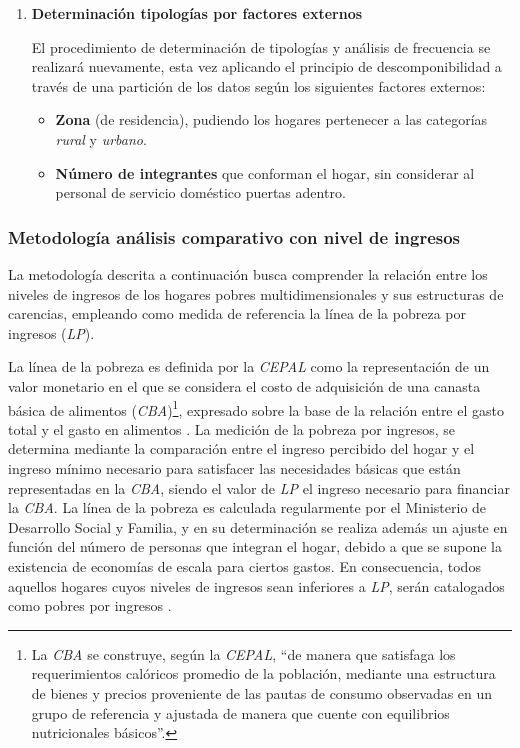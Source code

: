 \documentclass[12pt,letterpaper,spanish]{article}
\begin{document}
\begin{enumerate}
\item \textbf{Determinación tipologías por factores externos}

El procedimiento de determinación de tipologías y análisis de frecuencia se realizará nuevamente, esta vez  aplicando el principio de descomponibilidad a través de una partición de los datos según los siguientes factores externos:

    \begin{itemize}
        \item  \textbf{Zona} (de residencia), pudiendo los hogares pertenecer a las categorías \textit{rural} y \textit{urbano}. 
        \item \textbf{Número de integrantes} que conforman el hogar, sin considerar al personal de servicio doméstico puertas adentro. 
    \end{itemize}
\end{enumerate}


\subsubsection{Metodología análisis comparativo con nivel de ingresos}

La metodología descrita a continuación busca comprender la relación entre los niveles de ingresos de los hogares pobres multidimensionales y sus estructuras de carencias, empleando como medida de referencia la línea de la pobreza por ingresos (\textit{LP}). 

La línea de la pobreza es definida por la \textit{CEPAL} como la representación de un valor monetario en el que se considera el costo de adquisición de una canasta básica de alimentos (\textit{CBA})\footnote{La \textit{CBA} se construye, según la \textit{CEPAL},  ``de manera que satisfaga los requerimientos calóricos promedio de la población, mediante una estructura de bienes y precios proveniente de las pautas de consumo observadas en un grupo de referencia y ajustada de manera que cuente con equilibrios nutricionales básicos''\cite{CEPAL2018MedicionResultados}.}, expresado sobre la base de la relación entre el gasto total y el gasto en alimentos \cite{CEPAL2018MedicionResultados}. La medición de la pobreza por ingresos, se determina mediante la comparación entre el ingreso percibido del hogar y el ingreso mínimo necesario para satisfacer las necesidades básicas que están representadas en la \textit{CBA}, siendo el valor de \textit{LP} el ingreso necesario para financiar la \textit{CBA}. La línea de la pobreza es calculada regularmente por el Ministerio de Desarrollo Social y Familia, y en su determinación se realiza además un ajuste en función del número de personas que integran el hogar, debido a que se supone la existencia de economías de escala para ciertos gastos. En consecuencia, todos aquellos hogares cuyos niveles de ingresos sean inferiores a \textit{LP}, serán catalogados como pobres por ingresos \cite{CEPAL2018Medicion2017}.
\end{document}
